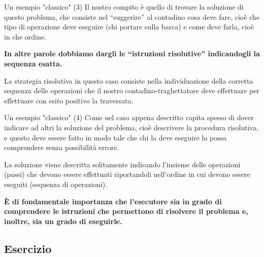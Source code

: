 \documentclass[
    notheorems,
    11pt,
    compress,
    aspectratio=169
]{beamer}
\begin{document}
\begin{frame}{Un esempio "classico" (3)}
    Il nostro compito è quello di trovare la soluzione di questo problema, che consiste nel “suggerire” al contadino cosa deve fare, cioè che tipo di operazione deve eseguire (chi portare sulla barca) e come deve farla, cioè in che ordine.

    \pause
    \vfill

    \textbf{In altre parole dobbiamo dargli le “istruzioni risolutive” indicandogli la sequenza esatta.}

    \pause
    \vfill

    La strategia risolutiva in questo caso consiste nella individuazione della corretta sequenza delle operazioni che il nostro contadino-traghettatore deve effettuare per effettuare con esito positivo la traversata.
\end{frame}

\begin{frame}{Un esempio "classico" (4)}
    Come nel caso appena descritto capita spesso di dover indicare ad altri la soluzione del problema, cioè descrivere la procedura risolutiva, e questo deve essere fatto in modo tale che chi la deve eseguire la possa comprendere senza possibilità errore.

    \pause
    \vspace{0.5cm}

    La soluzione viene descritta solitamente indicando l’insieme delle operazioni (passi) che devono essere effettuati riportandoli nell’ordine in cui devono essere eseguiti (sequenza di operazioni).

    \pause
    \vspace{0.5cm}

    \textbf{È di fondamentale importanza che l’esecutore sia in grado di comprendere le istruzioni che permettono di risolvere il problema e, inoltre, sia un grado di eseguirle.}
\end{frame}


\subsection{Esercizio}
\end{document}
